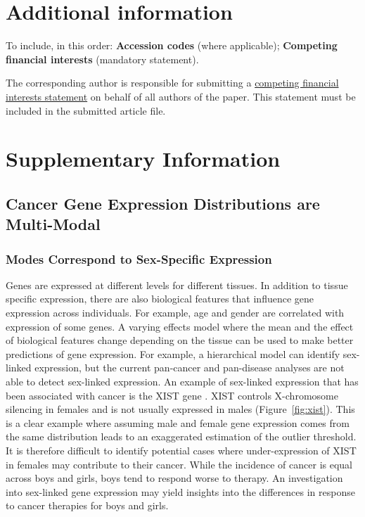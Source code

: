 \documentclass[fleqn,10pt]{wlscirep}
\newcommand{\figref}[1]{Figure~\ref{fig:#1}}
\newcommand{\beginsupplement}{%
        \setcounter{table}{0}
        \renewcommand{\thetable}{S\arabic{table}}%
        \setcounter{figure}{0}
        \renewcommand{\thefigure}{S\arabic{figure}}%
     }
\begin{document}
\section*{Additional information}

To include, in this order: \textbf{Accession codes} (where applicable); \textbf{Competing financial interests} (mandatory statement). 

The corresponding author is responsible for submitting a \href{http://www.nature.com/srep/policies/index.html#competing}{competing financial interests statement} on behalf of all authors of the paper. This statement must be included in the submitted article file.

\beginsupplement
\section*{Supplementary Information}

\subsection*{Cancer Gene Expression Distributions are Multi-Modal}
\subsubsection*{Modes Correspond to Sex-Specific Expression}
Genes are expressed at different levels for different tissues. In addition to tissue specific expression, there are also biological features that influence gene expression across individuals. For example, age and gender are correlated with expression of some genes. A varying effects model where the mean and the effect of biological features change depending on the tissue can be used to make better predictions of gene expression. For example, a hierarchical model can identify sex-linked expression, but the current pan-cancer and pan-disease analyses are not able to detect sex-linked expression. An example of sex-linked expression that has been associated with cancer is the XIST gene \cite{yildirim2013xist}. XIST controls X-chromosome silencing in females and is not usually expressed in males (\figref{xist}). This is a clear example where assuming male and female gene expression comes from the same distribution leads to an exaggerated estimation of the outlier threshold. It is therefore difficult to identify potential cases where under-expression of XIST in females may contribute to their cancer. While the incidence of cancer is equal across boys and girls, boys tend to respond worse to therapy. An investigation into sex-linked gene expression may yield insights into the differences in response to cancer therapies for boys and girls. 
\end{document}
